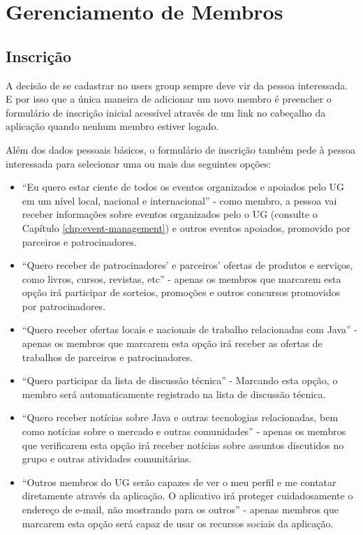 \documentclass[envcountsame,envcountchap,letterpaper]{svmono}
\begin{document}
\chapter{Gerenciamento de Membros}

\section{Inscrição}

A decisão de se cadastrar no users group sempre deve vir da pessoa interessada. E por isso que a única maneira de adicionar um novo membro é preencher o formulário de inscrição inicial acessível através de um link no cabeçalho da aplicação quando nenhum membro estiver logado.

Além dos dados pessoais básicos, o formulário de inscrição também pede à pessoa interessada para selecionar uma ou mais das seguintes opções:

\begin{itemize}
\item ``Eu quero estar ciente de todos os eventos organizados e apoiados pelo UG em um nível local, nacional e internacional'' - como membro, a pessoa vai receber informações sobre eventos organizados pelo o UG (consulte o Capítulo \ref{chp:event-management}) e outros eventos apoiados, promovido por parceiros e patrocinadores.

\item ``Quero receber de patrocinadores' e parceiros' ofertas de produtos e serviços, como livros, cursos, revistas, etc'' - apenas os membros que marcarem esta opção irá participar de sorteios, promoções e outros concursos promovidos por patrocinadores.

\item ``Quero receber ofertas locais e nacionais de trabalho relacionadas com Java'' - apenas os membros que marcarem esta opção irá receber as ofertas de trabalhos de parceiros e patrocinadores.

\item ``Quero participar da lista de discussão técnica'' - Marcando esta opção, o membro será automaticamente registrado na lista de discussão técnica.

\item ``Quero receber notícias sobre Java e outras tecnologias relacionadas, bem como notícias sobre o mercado e outras comunidades'' - apenas os membros que verificarem esta opção irá receber notícias sobre assuntos discutidos no grupo e outras atividades comunitárias.

\item ``Outros membros do UG serão capazes de ver o meu perfil e me contatar diretamente através da aplicação. O aplicativo irá proteger cuidadosamente o endereço de e-mail, não mostrando para os outros'' - apenas membros que marcarem esta opção será capaz de usar os recursos sociais da aplicação.
\end{itemize}
\end{document}
